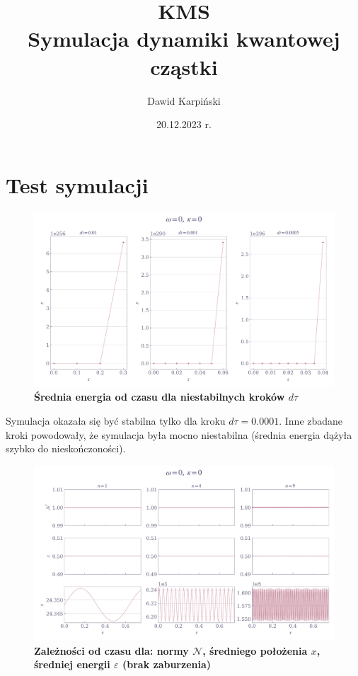 \documentclass[11pt,a4paper]{article}
\begin{document}
\title{\textbf{KMS\\Symulacja dynamiki kwantowej cząstki}}
\author{Dawid Karpiński}
\date{20.12.2023 r.}
\maketitle
\pagebreak

\section{Test symulacji}

\begin{figure}[ht!]
    \caption{\textbf{Średnia energia od czasu dla niestabilnych kroków $d\tau$}}
    \vspace{0.2cm}
    \includegraphics[width=\linewidth]{../figures/unstable.pdf}
\end{figure}

Symulacja okazała się być stabilna tylko dla kroku $d\tau=0.0001$. Inne zbadane kroki powodowały, że symulacja była mocno niestabilna (średnia energia dążyła szybko do nieskończoności).

\begin{figure}[ht!]
    \caption{\textbf{Zależności od czasu dla: normy $\mathcal{N}$, średniego położenia $x$, średniej energii $\varepsilon$ (brak zaburzenia)}}
    \vspace{0.2cm}
    \includegraphics[width=\linewidth]{../figures/stationary.pdf}
\end{figure}
\end{document}
